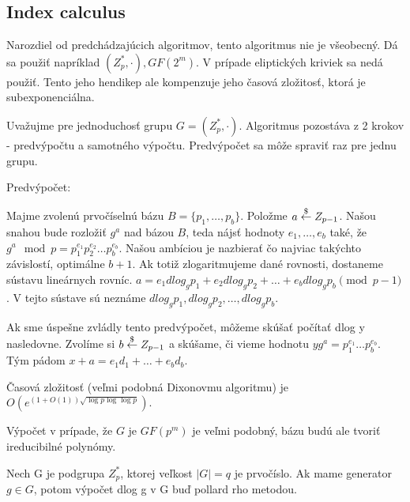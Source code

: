 \subsection{Index calculus}
Narozdiel od predchádzajúcich algoritmov, tento algoritmus nie je
všeobecný. Dá sa použiť napríklad $(Z_p^*,\cdot), GF(2^m)$.
V prípade eliptických kriviek sa nedá použiť. Tento jeho hendikep
ale kompenzuje jeho časová zložitosť, ktorá je subexponenciálna.

Uvažujme pre jednoduchosť grupu $G=(Z_p^*,\cdot)$.
Algoritmus pozostáva z 2 krokov - predvýpočtu a samotného výpočtu.
Predvýpočet sa môže spraviť raz pre jednu grupu.

Predvýpočet:

Majme zvolenú prvočíselnú bázu $B=\{p_1,\dots,p_b\}$.
Položme $a \overset{\$}{\leftarrow} Z_{p-1}$. 
Našou snahou bude rozložiť $g^a$ nad bázou $B$, teda nájsť hodnoty
$e_1,\dots,e_b$ také, že $g^a \mod p = p_1^{e_1} p_2^{e_2} \dots
p_b^{e_b}$.
Našou ambíciou je nazbierať čo najviac takýchto závislostí, optimálne
$b+1$. Ak totiž zlogaritmujeme dané rovnosti, dostaneme sústavu
lineárnych rovníc.
$a=e_1 dlog_g p_1 + e_2 dlog_g p_2 + \dots + e_b dlog_g p_b \pmod{p-1}$.
V tejto sústave sú neznáme $dlog_g p_1, dlog_g p_2, \dots, dlog_g p_b$.

Ak sme úspešne zvládly tento predvýpočet, môžeme skúšať počítať dlog y
nasledovne.
Zvolíme si $b\overset{\$}{\leftarrow} Z_{p-1}$ a skúšame, či vieme hodnotu
$y g^a = p_1 ^ {e_1} \dots p_b ^ {e_b}$. Tým pádom
$x+a = e_1 d_1 + \dots + e_b d_b$.

Časová zložitosť (veľmi podobná Dixonovmu algoritmu) je
$O(e^{(1+O(1))\sqrt{\log p \log \log p}})$.

\begin{poznamka}
    Výpočet v prípade, že $G$ je $GF(p^m)$ je veľmi podobný, bázu budú ale
    tvoriť ireducibilné polynómy.
\end{poznamka}
\begin{poznamka}
    Nech G je podgrupa $Z_p^*$, ktorej veľkost $|G|=q$ je prvočíslo.
    Ak mame generator $g\in G$, potom výpočet dlog g v G buď pollard rho
    metodou.
\end{poznamka}
